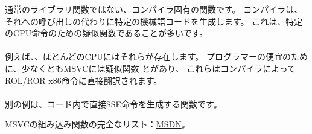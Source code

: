 \label{sec:compiler_intrinsic}


通常のライブラリ関数ではない、コンパイラ固有の関数です。
コンパイラは、それへの呼び出しの代わりに特定の機械語コードを生成します。
これは、特定の\ac{CPU}命令のための疑似関数であることが多いです。\\
\\
例えば、、ほとんどの\ac{CPU}にはそれらが存在します。
プログラマーの便宜のために、少なくともMSVCには疑似関数
と\FNMSDNROTxURL{}があり、
これらはコンパイラによってROL/ROR x86命令に直接翻訳されます。\\
\\
別の例は、コード内で直接SSE命令を生成する関数です。

MSVCの組み込み関数の完全なリスト：\href{http://go.yurichev.com/17254}{MSDN}。